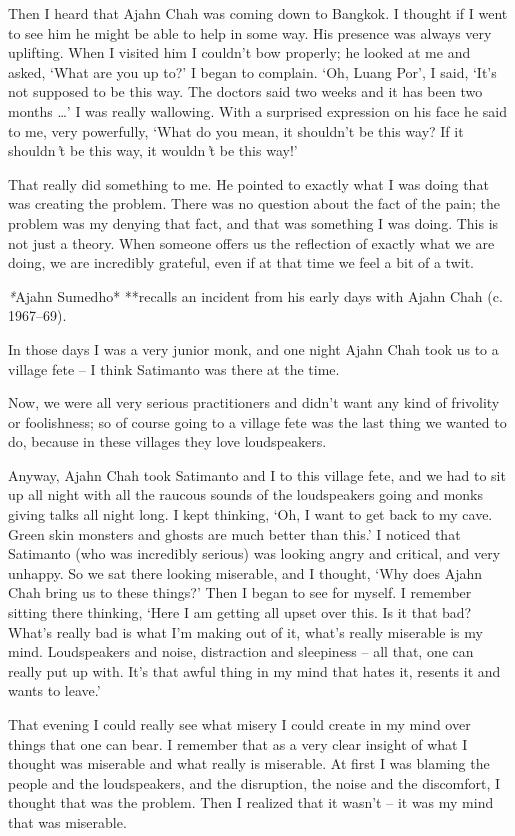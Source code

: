 Then I heard that Ajahn Chah was coming down to Bangkok. I thought if I
went to see him he might be able to help in some way. His presence was
always very uplifting. When I visited him I couldn't bow properly; he
looked at me and asked, `What are you up to?' I began to complain. `Oh,
Luang Por', I said, `It's not supposed to be this way. The doctors said
two weeks and it has been two months \ldots{}' I was really wallowing.
With a surprised expression on his face he said to me, very powerfully,
`What do you mean, it shouldn't be this way? If it shouldn\emph{'}t be
this way, it wouldn\emph{'}t be this way!'

That really did something to me. He pointed to exactly what I was doing
that was creating the problem. There was no question about the fact of
the pain; the problem was my denying that fact, and that was something I
was doing. This is not just a theory. When someone offers us the
reflection of exactly what we are doing, we are incredibly grateful,
even if at that time we feel a bit of a twit.

\emph{*}Ajahn Sumedho* **recalls an incident from his early days with
Ajahn Chah (c. 1967--69).

In those days I was a very junior monk, and one night Ajahn Chah took us
to a village fete -- I think Satimanto was there at the time.

Now, we were all very serious practitioners and didn't want any kind of
frivolity or foolishness; so of course going to a village fete was the
last thing we wanted to do, because in these villages they love
loudspeakers.

Anyway, Ajahn Chah took Satimanto and I to this village fete, and we had
to sit up all night with all the raucous sounds of the loudspeakers
going and monks giving talks all night long. I kept thinking, `Oh, I
want to get back to my cave. Green skin monsters and ghosts are much
better than this.' I noticed that Satimanto (who was incredibly serious)
was looking angry and critical, and very unhappy. So we sat there
looking miserable, and I thought, `Why does Ajahn Chah bring us to these
things?' Then I began to see for myself. I remember sitting there
thinking, `Here I am getting all upset over this. Is it that bad? What's
really bad is what I'm making out of it, what's really miserable is my
mind. Loudspeakers and noise, distraction and sleepiness -- all that,
one can really put up with. It's that awful thing in my mind that hates
it, resents it and wants to leave.'

That evening I could really see what misery I could create in my mind
over things that one can bear. I remember that as a very clear insight
of what I thought was miserable and what really is miserable. At first I
was blaming the people and the loudspeakers, and the disruption, the
noise and the discomfort, I thought that was the problem. Then I
realized that it wasn't -- it was my mind that was miserable.


